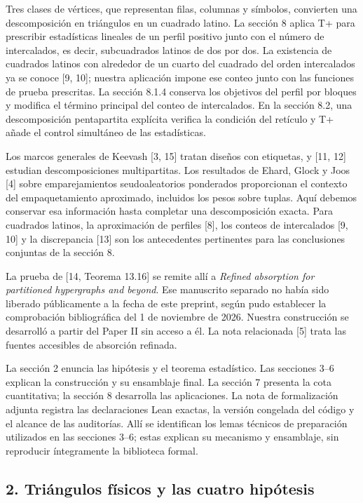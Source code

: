 \documentclass[spanish,11pt,a4paper]{article}
\begin{document}
Tres clases de vértices, que representan filas, columnas y símbolos, convierten una descomposición en triángulos en un cuadrado latino. La sección 8 aplica T+ para prescribir estadísticas lineales de un perfil positivo junto con el número de intercalados, es decir, subcuadrados latinos de dos por dos. La existencia de cuadrados latinos con alrededor de un cuarto del cuadrado del orden intercalados ya se conoce {[}9, 10{]}; nuestra aplicación impone ese conteo junto con las funciones de prueba prescritas. La sección 8.1.4 conserva los objetivos del perfil por bloques y modifica el término principal del conteo de intercalados. En la sección 8.2, una descomposición pentapartita explícita verifica la condición del retículo y T+ añade el control simultáneo de las estadísticas.

Los marcos generales de Keevash {[}3, 15{]} tratan diseños con etiquetas, y {[}11, 12{]} estudian descomposiciones multipartitas. Los resultados de Ehard, Glock y Joos {[}4{]} sobre emparejamientos seudoaleatorios ponderados proporcionan el contexto del empaquetamiento aproximado, incluidos los pesos sobre tuplas. Aquí debemos conservar esa información hasta completar una descomposición exacta. Para cuadrados latinos, la aproximación de perfiles {[}8{]}, los conteos de intercalados {[}9, 10{]} y la discrepancia {[}13{]} son los antecedentes pertinentes para las conclusiones conjuntas de la sección 8.

La prueba de {[}14, Teorema 13.16{]} se remite allí a \emph{Refined absorption for partitioned hypergraphs and beyond}. Ese manuscrito separado no había sido liberado públicamente a la fecha de este preprint, según pudo establecer la comprobación bibliográfica del 1 de noviembre de 2026. Nuestra construcción se desarrolló a partir del Paper II sin acceso a él. La nota relacionada {[}5{]} trata las fuentes accesibles de absorción refinada.

La sección 2 enuncia las hipótesis y el teorema estadístico. Las secciones 3--6 explican la construcción y su ensamblaje final. La sección 7 presenta la cota cuantitativa; la sección 8 desarrolla las aplicaciones. La nota de formalización adjunta registra las declaraciones Lean exactas, la versión congelada del código y el alcance de las auditorías. Allí se identifican los lemas técnicos de preparación utilizados en las secciones 3--6; estas explican su mecanismo y ensamblaje, sin reproducir íntegramente la biblioteca formal.

\subsection{2. Triángulos físicos y las cuatro hipótesis}\label{triuxe1ngulos-fuxedsicos-y-las-cuatro-hipuxf3tesis}
\end{document}
